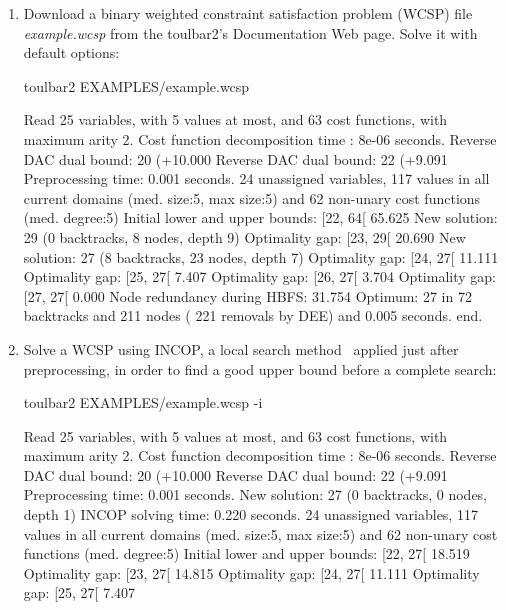 \begin{enumerate}
\item Download a binary weighted constraint satisfaction problem (WCSP) file {\em example.wcsp} from the toulbar2's Documentation Web page. Solve it with default options:
\begin{DoxyCode}
	toulbar2 EXAMPLES/example.wcsp
\end{DoxyCode}
{\scriptsize
\begin{DoxyCode}
Read 25 variables, with 5 values at most, and 63 cost functions, with maximum arity 2.
Cost function decomposition time : 8e-06 seconds.
Reverse DAC dual bound: 20 (+10.000%
Reverse DAC dual bound: 22 (+9.091%
Preprocessing time: 0.001 seconds.
24 unassigned variables, 117 values in all current domains (med. size:5, max size:5) and 62 non-unary cost functions (med. degree:5)
Initial lower and upper bounds: [22, 64[ 65.625%
New solution: 29 (0 backtracks, 8 nodes, depth 9)
Optimality gap: [23, 29[ 20.690 %
New solution: 27 (8 backtracks, 23 nodes, depth 7)
Optimality gap: [24, 27[ 11.111 %
Optimality gap: [25, 27[ 7.407 %
Optimality gap: [26, 27[ 3.704 %
Optimality gap: [27, 27[ 0.000 %
Node redundancy during HBFS: 31.754 %
Optimum: 27 in 72 backtracks and 211 nodes ( 221 removals by DEE) and 0.005 seconds.
end.
\end{DoxyCode}}
\item Solve a WCSP using INCOP, a local search method~\cite{idwalk:cp04} applied just after preprocessing, in order to find a good upper bound before a complete search:
\begin{DoxyCode}
	toulbar2 EXAMPLES/example.wcsp -i
\end{DoxyCode}
{\scriptsize
\begin{DoxyCode}
Read 25 variables, with 5 values at most, and 63 cost functions, with maximum arity 2.
Cost function decomposition time : 8e-06 seconds.
Reverse DAC dual bound: 20 (+10.000%
Reverse DAC dual bound: 22 (+9.091%
Preprocessing time: 0.001 seconds.
New solution: 27 (0 backtracks, 0 nodes, depth 1)
INCOP solving time: 0.220 seconds.
24 unassigned variables, 117 values in all current domains (med. size:5, max size:5) and 62 non-unary cost functions (med. degree:5)
Initial lower and upper bounds: [22, 27[ 18.519%
Optimality gap: [23, 27[ 14.815 %
Optimality gap: [24, 27[ 11.111 %
Optimality gap: [25, 27[ 7.407 %

\end{DoxyCode}}
\end{enumerate}
